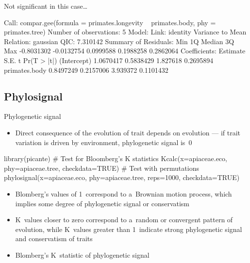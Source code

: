 \documentclass[compress, ucs, xelatex, 11pt, xcolor=svgnames,
	hyperref={
		bookmarks=true,
		unicode=true,
		colorlinks=true,
		pdftitle={Molecular data in R},
		plainpages=false,
		pdfauthor={Vojtech Zeisek},
		pdfsubject={Course about phylogeny and evolution in R},
		pdfcreator={XeLaTeX},
		pdfkeywords={R, evolution, phylogeny, molecular data},
		linkcolor=Tomato,
		anchorcolor=SaddleBrown,
		citecolor=Goldenrod,
		filecolor=DarkMagenta,
		menucolor=Sienna,
		urlcolor=DarkTurquoise,
		pdftex},
	url={hyphens, lowtilde} %
	]{beamer}
\begin{document}
\begin{frame}[fragile]{Not significant in this case\ldots}
	\begin{spluscode}
    Call: compar.gee(formula = primates.longevity ~
      primates.body, phy = primates.tree)
    Number of observations: 5
    Model:
                         Link: identity
    Variance to Mean Relation: gaussian
    QIC: 7.310142
    Summary of Residuals:
           Min         1Q     Median         3Q        Max
    -0.8031302 -0.0132754  0.0999588  0.1988258  0.2862064
    Coefficients:
                   Estimate      S.E.        t Pr(T > |t|)
    (Intercept)   1.0670417 0.5838429 1.827618   0.2695894
    primates.body 0.8497249 0.2157006 3.939372   0.1101432
	\end{spluscode}
\end{frame}

%
%

\subsection{Phylosignal}

\begin{frame}[fragile]{Phylogenetic signal}
	\begin{itemize}
		\item Direct consequence of the evolution of trait depends on evolution --- if trait variation is driven by environment, phylogenetic signal is~0
	\end{itemize}
	\begin{spluscode}
    library(picante)
    # Test for Bloomberg's K statistics
    Kcalc(x=apiaceae.eco, phy=apiaceae.tree, checkdata=TRUE)
    # Test with permutations
    phylosignal(x=apiaceae.eco, phy=apiaceae.tree, reps=1000,
      checkdata=TRUE)
	\end{spluscode}
	\begin{itemize}
		\item Blomberg's values of 1~correspond to a~Brownian motion process, which implies some degree of phylogenetic signal or conservatism
		\item K~values closer to zero correspond to a~random or convergent pattern of evolution, while K~values greater than 1~indicate strong phylogenetic signal and conservatism of traits
		\item Blomberg's K~statistic of phylogenetic signal
	\end{itemize}
\end{frame}
\end{document}
